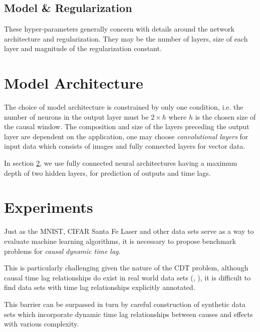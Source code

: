 \documentclass[runningheads]{llncs}
\begin{document}
\subsection{Model \& Regularization}

These hyper-parameters generally concern with details around the network architecture and 
regularization. They may be the number of layers, size of each layer and magnitude of the 
regularization constant.



\section{Model Architecture}

The choice of model architecture is constrained by only one condition, i.e. the number of neurons 
in the output layer must be $2 \times h$ where $h$ is the chosen size of the causal window. 
The composition and size of the layers preceding the output layer are dependent on the application, 
one may choose \emph{convolutional layers} for input data which consists of images and fully connected 
layers for vector data.



In section \ref{sec:exp}, we use fully connected neural architectures having a maximum depth of 
two hidden layers, for prediction of outputs and time lags.

\section{Experiments}\label{sec:exp}


Just as the MNIST, CIFAR Santa Fe Laser and other data sets serve as a way to evaluate machine learning 
algorithms, it is necessary to propose benchmark problems for \emph{causal dynamic time lag}.

This is particularly challenging given the nature of the CDT problem, although causal time lag 
relationships do exist in real world data sets (\cite{doi:10.1002/jgra.50429}, \cite{ZHOU2006195}), 
it is difficult to find data sets with time lag relationships explicitly annotated.

This barrier can be surpassed in turn by careful construction of synthetic data sets which incorporate 
dynamic time lag relationships between causes and effects with various complexity.
\end{document}
